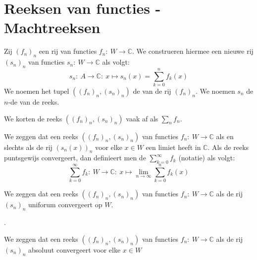 \documentclass[main.tex]{subfiles}
\begin{document}
\section{Reeksen van functies - Machtreeksen}
\label{sec:reeksen-van-functies}

\begin{de}
  Zij $(f_{n})_{n}$ een rij van functies $f_{n}:\ W  \rightarrow \mathbb{C}$.
  We construeren hiermee een nieuwe rij $(s_{n})_{n}$ van functies $s_{n}:\ W \rightarrow \mathbb{C}$ als volgt:
  \[ s_{n}:\ A \rightarrow \mathbb{C}:\ x \mapsto s_{n}(x) = \sum_{k=0}^{n}f_{k}(x) \]
  We noemen het tupel $((f_{n})_{n},(s_{n})_{n})$ de  van de rij $(f_{n})_{n}$.
  We noemen $s_{n}$ de $n$-de  van de reeks.
\end{de}

\begin{de}
  We korten de reeks $((f_{n})_{n},(s_{n})_{n})$ vaak af als $\sum_{n}f_{n}$.
\end{de}

\begin{de}
  We zeggen dat een reeks $((f_{n})_{n},(s_{n})_{n})$ van functies $f_{n}:\ W \rightarrow \mathbb{C}$  als en slechts als de rij $(s_{n}(x))_{n}$ voor elke $x\in W$ een limiet heeft in $\mathbb{C}$.
  Als de reeks puntsgewijs convergeert, dan definieert men de  $\sum_{k=0}^{\infty}f_{k}$ (notatie) als volgt:
  \[ \sum_{k=0}^{\infty}f_{k}:\ W \rightarrow \mathbb{C}:\ x \mapsto \lim_{n \rightarrow \infty}\sum_{k=0}^{n}f_{k}(x) \]
\end{de}

\begin{de}
  We zeggen dat een reeks $((f_{n})_{n},(s_{n})_{n})$ van functies $f_{n}:\ W \rightarrow \mathbb{C}$  als de rij $(s_{n})_{n}$ uniforum convergeert op $W$.
\end{de}

.

\begin{de}
  We zeggen dat een reeks $((f_{n})_{n},(s_{n})_{n})$ van functies $f_{n}:\ W \rightarrow \mathbb{C}$  als de rij $(s_{n})_{n}$ absoluut convergeert voor elke $x \in W$
\end{de}
\end{document}
